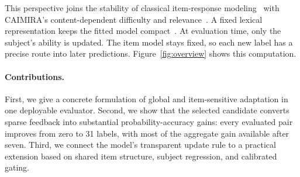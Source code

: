 This perspective joins the stability of classical item-response modeling~\citep{rasch1960} with CAIMIRA's content-dependent difficulty and relevance~\citep{gor2024}. A fixed lexical representation keeps the fitted model compact~\citep{weinberger2009}. At evaluation time, only the subject's ability is updated. The item model stays fixed, so each new label has a precise route into later predictions. Figure~\ref{fig:overview} shows this computation.

\paragraph{Contributions.}
First, we give a concrete formulation of global and item-sensitive adaptation in one deployable evaluator. Second, we show that the selected candidate converts sparse feedback into substantial probability-accuracy gains: every evaluated pair improves from zero to 31 labels, with most of the aggregate gain available after seven. Third, we connect the model's transparent update rule to a practical extension based on shared item structure, subject regression, and calibrated gating.

